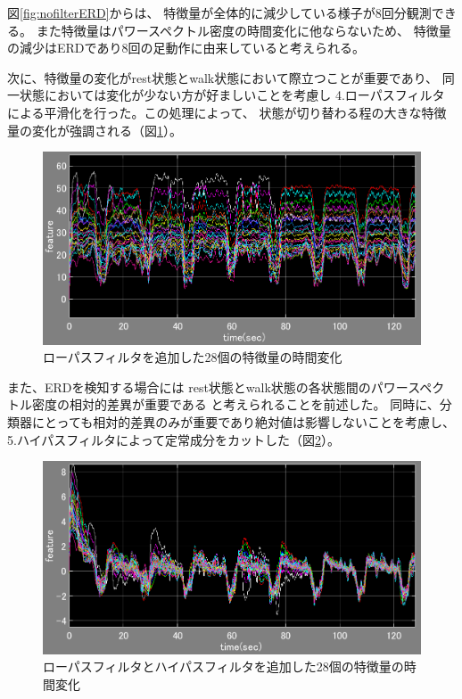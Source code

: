 図\ref{fig:nofilterERD}からは、
特徴量が全体的に減少している様子が8回分観測できる。
また特徴量はパワースペクトル密度の時間変化に他ならないため、
特徴量の減少はERDであり8回の足動作に由来していると考えられる。

次に、特徴量の変化がrest状態とwalk状態において際立つことが重要であり、
同一状態においては変化が少ない方が好ましいことを考慮し
4.ローパスフィルタによる平滑化を行った。この処理によって、
状態が切り替わる程の大きな特徴量の変化が強調される（図\ref{fig:lfilterERD}）。
\begin{figure}[p]
    \centering
    \includegraphics[width=13cm]{images/feature_sub1_l.png}
    \caption{ローパスフィルタを追加した28個の特徴量の時間変化}
    \label{fig:lfilterERD}
\end{figure}

また、ERDを検知する場合には
rest状態とwalk状態の各状態間のパワースペクトル密度の相対的差異が重要である
と考えられることを前述した。
同時に、分類器にとっても相対的差異のみが重要であり絶対値は影響しないことを考慮し、
5.ハイパスフィルタによって定常成分をカットした（図\ref{fig:filterERD}）。
\begin{figure}[p]
    \centering
    \includegraphics[width=13cm]{images/feature_sub1.png}
    \caption{ローパスフィルタとハイパスフィルタを追加した28個の特徴量の時間変化}
    \label{fig:filterERD}
\end{figure}

